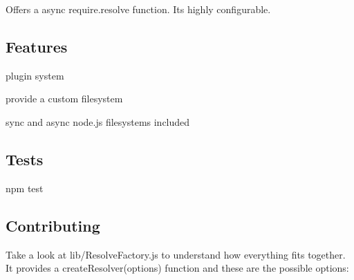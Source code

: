 Offers a async require.\+resolve function. It\textquotesingle{}s highly configurable.

\subsection*{Features}


\begin{DoxyItemize}
\item plugin system
\item provide a custom filesystem
\item sync and async node.\+js filesystems included
\end{DoxyItemize}

\subsection*{Tests}


\begin{DoxyCode}
npm test
\end{DoxyCode}


\href{http://travis-ci.org/webpack/enhanced-resolve}{\tt }

\subsection*{Contributing}

Take a look at {\ttfamily lib/\+Resolve\+Factory.\+js} to understand how everything fits together. It provides a {\ttfamily create\+Resolver(options)} function and these are the possible options\+:

